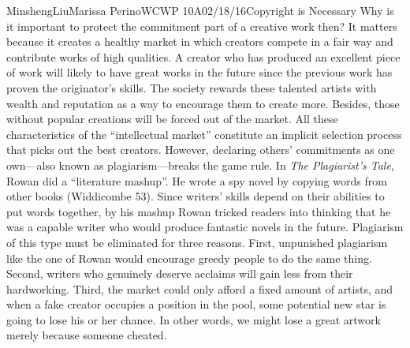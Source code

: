 \documentclass[12pt,letterpaper]{article}
\begin{document}
\begin{mla}{Minsheng}{Liu}{Marissa Perino}{WCWP 10A}{02/18/16}{Copyright is Necessary}
  Why is it important to protect the commitment part of a creative work
  then? It matters because it creates a healthy market in which creators
  compete in a fair way and contribute works of high qualities. A creator
  who has produced an excellent piece of work will likely to have great
  works in the future since the previous work has proven the originator's
  skills. The society rewards these talented artists with wealth and
  reputation as a way to encourage them to create more. Besides, those
  without popular creations will be forced out of the market. All these
  characteristics of the ``intellectual market'' constitute an implicit
  selection process that picks out the best creators. However, declaring
  others' commitments as one own---also known as plagiarism---breaks the
  game rule. In \emph{The Plagiarist's Tale}, Rowan did a ``literature
  mashup''. He wrote a spy novel by copying words from other books
  (Widdicombe 53). Since writers' skills depend on their abilities to put
  words together, by his mashup Rowan tricked readers into thinking that
  he was a capable writer who would produce fantastic novels in the
  future. Plagiarism of this type must be eliminated for three reasons.
  First, unpunished plagiarism like the one of Rowan would encourage
  greedy people to do the same thing. Second, writers who genuinely
  deserve acclaims will gain less from their hardworking. Third, the
  market could only afford a fixed amount of artists, and when a fake
  creator occupies a position in the pool, some potential new star is
  going to lose his or her chance. In other words, we might lose a great
  artwork merely because someone cheated.


\end{mla}
\end{document}
